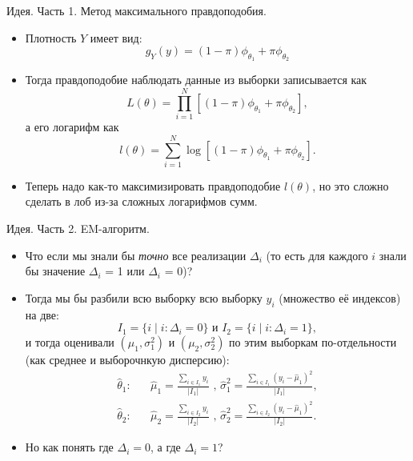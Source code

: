 \documentclass[9pt]{beamer}
\begin{document}
\begin{frame}{Идея. Часть 1. Метод максимального правдоподобия.}
\begin{itemize}
    \item Плотность $Y$ имеет вид:
    $$g_Y(y) = (1-\pi)\phi_{\theta_1} + \pi\phi_{\theta_2}$$
    \item Тогда правдоподобие наблюдать данные из выборки записывается как
    $$L(\theta) = \prod_{i=1}^N [(1-\pi)\phi_{\theta_1} + \pi\phi_{\theta_2}],$$
    а его логарифм как
    $$l(\theta) = \sum_{i=1}^N \log[(1-\pi)\phi_{\theta_1} + \pi\phi_{\theta_2}].$$
    \item Теперь надо как-то максимизировать правдоподобие $l(\theta)$, но это сложно сделать в лоб из-за сложных логарифмов сумм.
\end{itemize}
\end{frame}

\begin{frame}{Идея. Часть 2. EM-алгоритм.}
    \begin{itemize}
        \item Что если мы знали бы \textit{точно} все реализации $\Delta_i$ (то есть для каждого $i$ знали бы значение $\Delta_i$ = 1 или $\Delta_i$ = 0)?
        \item Тогда мы бы разбили всю выборку всю выборку $y_i$ (множество её индексов) на две:
        $$I_1 = \{i \;|\; i: \Delta_i=0\} \text{ и } I_2 = \{i \;|\; i: \Delta_i=1\},$$
        и тогда оценивали $(\mu_1, \sigma_1^2)$ и $(\mu_2, \sigma_2^2)$ по этим выборкам по-отдельности (как среднее и выборочнкую дисперсию):
        \begin{equation}\label{em_mu_sigma}
            \begin{split}
            \hat\theta_1: \;\;\;\;\;\; \hat\mu_1 = \frac{\sum\limits_{i\in I_1} y_i}{|I_1|}  \text{  ,  } \hat\sigma_1^2 = \frac{\sum\limits_{i\in I_1} (y_i - \hat\mu_1)^2}{|I_1|},\\
            \hat\theta_2: \;\;\;\;\;\; \hat\mu_2 = \frac{\sum\limits_{i\in I_2} y_i}{|I_2|}  \text{  ,  } \hat\sigma_2^2 = \frac{\sum\limits_{i\in I_2} (y_i - \hat\mu_1)^2}{|I_2|}.
            \end{split}
        \end{equation}
        \item Но как понять где $\Delta_i=0$, а где $\Delta_i = 1$?
    \end{itemize}
\end{frame}
\end{document}
